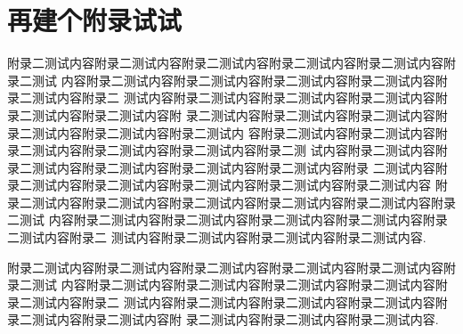 \chapter{再建个附录试试}

附录二测试内容附录二测试内容附录二测试内容附录二测试内容附录二测试内容附录二测试
内容附录二测试内容附录二测试内容附录二测试内容附录二测试内容附录二测试内容附录二
测试内容附录二测试内容附录二测试内容附录二测试内容附录二测试内容附录二测试内容附
录二测试内容附录二测试内容附录二测试内容附录二测试内容附录二测试内容附录二测试内
容附录二测试内容附录二测试内容附录二测试内容附录二测试内容附录二测试内容附录二测
试内容附录二测试内容附录二测试内容附录二测试内容附录二测试内容附录二测试内容附录
二测试内容附录二测试内容附录二测试内容附录二测试内容附录二测试内容附录二测试内容
附录二测试内容附录二测试内容附录二测试内容附录二测试内容附录二测试内容附录二测试
内容附录二测试内容附录二测试内容附录二测试内容附录二测试内容附录二测试内容附录二
测试内容附录二测试内容附录二测试内容附录二测试内容.

附录二测试内容附录二测试内容附录二测试内容附录二测试内容附录二测试内容附录二测试
内容附录二测试内容附录二测试内容附录二测试内容附录二测试内容附录二测试内容附录二
测试内容附录二测试内容附录二测试内容附录二测试内容附录二测试内容附录二测试内容附
录二测试内容附录二测试内容附录二测试内容.